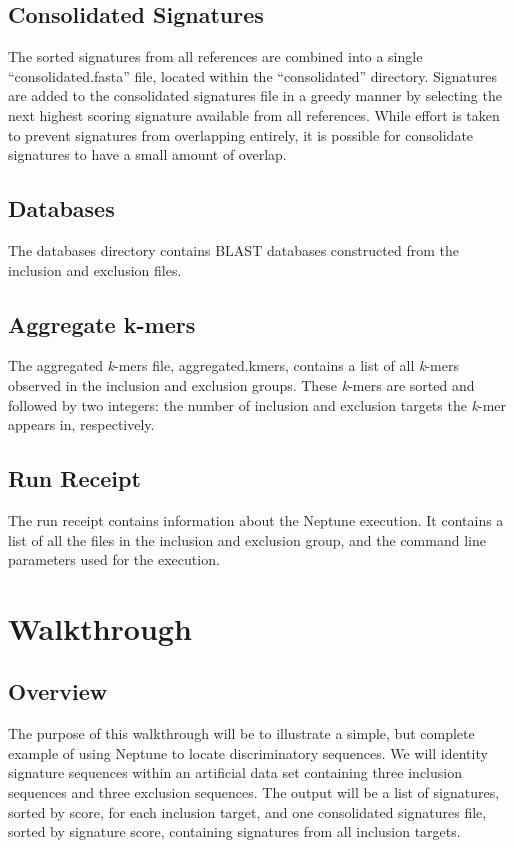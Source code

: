 \documentclass[a4paper,10pt]{article}
\begin{document}
\subsection{Consolidated Signatures}

The sorted signatures from all references are combined into a single ``consolidated.fasta'' file, located within the ``consolidated'' directory. Signatures are added to the consolidated signatures file in a greedy manner by selecting the next highest scoring signature available from all references. While effort is taken to prevent signatures from overlapping entirely, it is possible for consolidate signatures to have a small amount of overlap.

\subsection{Databases}

The databases directory contains BLAST databases constructed from the inclusion and exclusion files.

\subsection{Aggregate k-mers}

The aggregated \textit{k}-mers file, aggregated.kmers, contains a list of all \textit{k}-mers observed in the inclusion and exclusion groups. These \textit{k}-mers are sorted and followed by two integers: the number of inclusion and exclusion targets the \textit{k}-mer appears in, respectively.

\subsection{Run Receipt}

The run receipt contains information about the Neptune execution. It contains a list of all the files in the inclusion and exclusion group, and the command line parameters used for the execution.

\newpage
\section{Walkthrough}

\subsection{Overview}

The purpose of this walkthrough will be to illustrate a simple, but complete example of using Neptune to locate discriminatory sequences. We will identity signature sequences within an artificial data set containing three inclusion sequences and three exclusion sequences. The output will be a list of signatures, sorted by score, for each inclusion target, and one consolidated signatures file, sorted by signature score, containing signatures from all inclusion targets.
\end{document}

